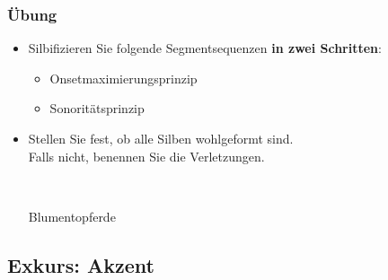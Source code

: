 {\begin{frame}
\begin{itemize}
	\end{itemize}

\end{frame}




\begin{frame}
\frametitle{Übung}

\begin{itemize}
\item Silbifizieren Sie folgende Segmentsequenzen \textbf{in zwei Schritten}:
\begin{itemize}
	\item Onsetmaximierungsprinzip
	\item Sonoritätsprinzip
\end{itemize}

\item Stellen Sie fest, ob alle Silben wohlgeformt sind.\\
Falls nicht, benennen Sie die Verletzungen.

\ea
{}\\ \pause
{}



\ex
Blumentopferde\\ \pause
{}
\z

\end{itemize}



\end{frame}




}%


\subsection{Exkurs: Akzent}


